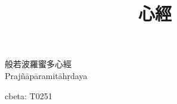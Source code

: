 \documentclass{ctexart}
\title{\Huge 心經}
\author{}
\date{}
\begin{document}
\maketitle
\vspace{1em}
\begin{center}
般若波羅蜜多心經\\[0.5em]
Prajñāpāramitāhṛdaya
\end{center}
\vfill
\begin{center}
cbeta: T0251
\end{center}
\Large



\vspace{1em}

\clearpage
\null
\thispagestyle{empty}
\end{document}
